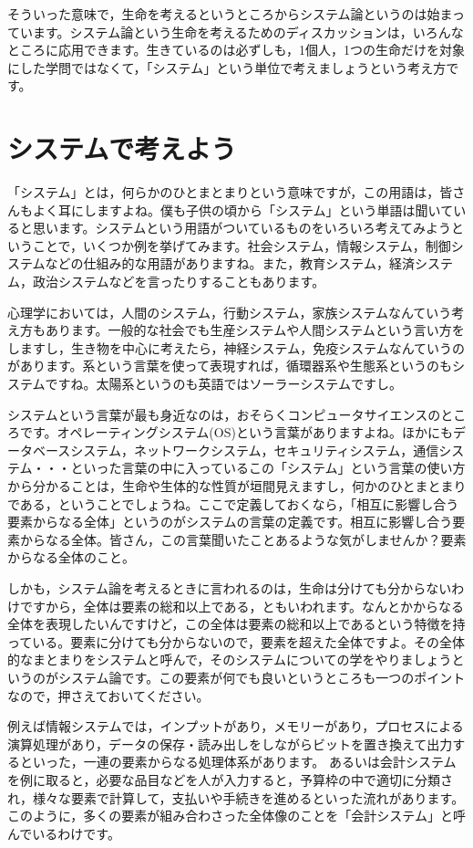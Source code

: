 \documentclass{ltjsbook}
\begin{document}
そういった意味で，生命を考えるというところからシステム論というのは始まっています。システム論という生命を考えるためのディスカッションは，いろんなところに応用できます。生きているのは必ずしも，1個人，1つの生命だけを対象にした学問ではなくて，「システム」という単位で考えましょうという考え方です。

\section{システムで考えよう}
「システム」とは，何らかのひとまとまりという意味ですが，この用語は，皆さんもよく耳にしますよね。僕も子供の頃から「システム」という単語は聞いていると思います。システムという用語がついているものをいろいろ考えてみようということで，いくつか例を挙げてみます。社会システム，情報システム，制御システムなどの仕組み的な用語がありますね。また，教育システム，経済システム，政治システムなどを言ったりすることもあります。

心理学においては，人間のシステム，行動システム，家族システムなんていう考え方もあります。一般的な社会でも生産システムや人間システムという言い方をしますし，生き物を中心に考えたら，神経システム，免疫システムなんていうのがあります。系という言葉を使って表現すれば，循環器系や生態系というのもシステムですね。太陽系というのも英語ではソーラーシステムですし。

システムという言葉が最も身近なのは，おそらくコンピュータサイエンスのところです。オペレーティングシステム(OS)という言葉がありますよね。ほかにもデータベースシステム，ネットワークシステム，セキュリティシステム，通信システム・・・といった言葉の中に入っているこの「システム」という言葉の使い方から分かることは，生命や生体的な性質が垣間見えますし，何かのひとまとまりである，ということでしょうね。ここで定義しておくなら，「相互に影響し合う要素からなる全体」というのがシステムの言葉の定義です。相互に影響し合う要素からなる全体。皆さん，この言葉聞いたことあるような気がしませんか？要素からなる全体のこと。

しかも，システム論を考えるときに言われるのは，生命は分けても分からないわけですから，全体は要素の総和以上である，ともいわれます。なんとかからなる全体を表現したいんですけど，この全体は要素の総和以上であるという特徴を持っている。要素に分けても分からないので，要素を超えた全体ですよ。その全体的なまとまりをシステムと呼んで，そのシステムについての学をやりましょうというのがシステム論です。この要素が何でも良いというところも一つのポイントなので，押さえておいてください。

例えば情報システムでは，インプットがあり，メモリーがあり，プロセスによる演算処理があり，データの保存・読み出しをしながらビットを置き換えて出力するといった，一連の要素からなる処理体系があります。
あるいは会計システムを例に取ると，必要な品目などを人が入力すると，予算枠の中で適切に分類され，様々な要素で計算して，支払いや手続きを進めるといった流れがあります。このように，多くの要素が組み合わさった全体像のことを「会計システム」と呼んでいるわけです。
\end{document}
